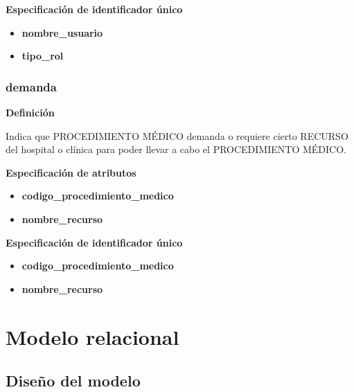 \documentclass[a4paper,11pt]{article}
\begin{document}
\textbf{Especificación de identificador único}

\begin{itemize}

    \item \textbf{nombre\_usuario}
   
    \item \textbf{tipo\_rol}
    
\end{itemize}

\subsubsection{\textbf{demanda}}

\textbf{Definición}

Indica que PROCEDIMIENTO MÉDICO demanda o requiere cierto RECURSO del hospital o clínica
para poder llevar a cabo el PROCEDIMIENTO MÉDICO.

\textbf{Especificación de atributos}

\begin{itemize}
     
    \item \textbf{codigo\_procedimiento\_medico}
   
    \item \textbf{nombre\_recurso} 

\end{itemize}

\textbf{Especificación de identificador único}

\begin{itemize}

    \item \textbf{codigo\_procedimiento\_medico}
   
    \item \textbf{nombre\_recurso} 

\end{itemize}

\newpage

\section{\textbf{Modelo relacional\label{HToc293405831}}}

\subsection{\textbf{Diseño del modelo\label{HToc293405832}}}
\end{document}
